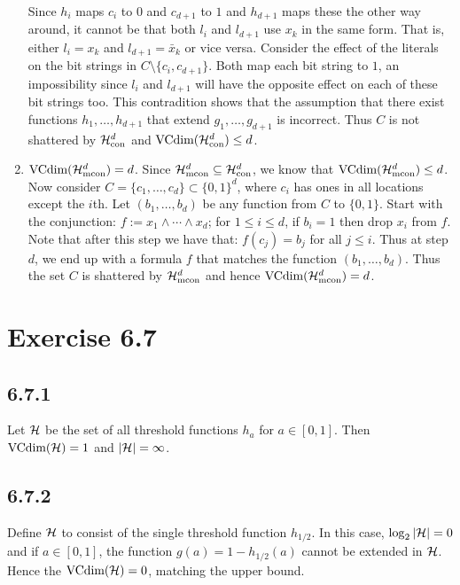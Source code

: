 \begin{enumerate}
        Since $h_i$ maps $c_i$ to $0$ and $c_{d + 1}$ to $1$ and $h_{d + 1}$ maps
        these the other way around, it cannot be that both $l_i$ and $l_{d + 1}$ 
        use $x_k$ in the same form. That is, either $l_i = x_k$ and $l_{d+1} = 
        \bar{x}_k$ or vice versa. Consider the effect of the literals on the 
        bit strings in $C \setminus \{c_i, c_{d+1}\}$. Both map each bit string to 
        $1$, an impossibility since $l_i$ and $l_{d + 1}$ will have the opposite 
        effect on each of these bit strings too. This contradition shows that the 
        assumption that there exist functions $h_1, \ldots, h_{d + 1}$ that extend 
        $g_1, \ldots, g_{d + 1}$ is incorrect. Thus $C$ is not shattered by $\mathcal{H}_{\text{con}}^{d}$
        and $\text{VCdim} (\mathcal{H}_{\text{con}}^{d}) \leq d$. 

    \item $\text{VCdim} (\mathcal{H}_{\text{mcon}}^{d}) = d$. Since $\mathcal{H}_{\text{mcon}}^{d} \subseteq \mathcal{H}_{\text{con}}^{d}$, we know 
        that $\text{VCdim} (\mathcal{H}_{\text{mcon}}^{d}) \leq d$. Now consider $C = \{c_1, \ldots, c_d\} 
        \subset \{0, 1\}^d$, where $c_i$ has ones in all locations except the $i$th. 
        Let $(b_1, \ldots, b_d)$ be any function from $C$ to $\{0, 1\}$.  
        Start with the conjunction: $f := x_1 \wedge 
        \cdots \wedge x_{d}$; for $1 \leq i \leq d$, 
        if $b_i = 1$ then drop $x_i$ from $f$. 
        Note that after this step we have that: $f(c_j) = b_j$ for all $j \leq i$.
        Thus at step $d$, we end up with a formula $f$ that matches the function 
        $(b_1, \ldots, b_d)$.
        Thus the set $C$ is shattered by $\mathcal{H}_{\text{mcon}}^{d}$ and hence 
        $\text{VCdim} (\mathcal{H}_{\text{mcon}}^{d}) = d$.
\end{enumerate}

\section*{Exercise 6.7}

\subsection*{6.7.1} Let $\mathcal{H}$ be the set of all threshold functions $h_a$
for $a \in [0, 1]$. Then $\text{VCdim} (\mathcal{H}) = 1$ and  $|\mathcal{H}| = \infty$.

\subsection*{6.7.2} Define $\mathcal{H}$ to consist of the single threshold function
$h_{1/2}$. In this case, $\log_2 |\mathcal{H}| = 0$ and if $a \in [0, 1]$, the 
function $g(a) = 1 - h_{1/2}(a)$ cannot be extended in $\mathcal{H}$. Hence the 
$\text{VCdim} (\mathcal{H}) = 0$, matching the upper bound.
  
